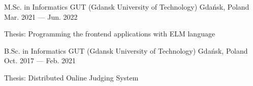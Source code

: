 
\begin{cventries}

  \cventry
    {M.Sc. in Informatics} %
    {GUT (Gdansk University of Technology)} %
    {Gdańsk, Poland} %
    {Mar. 2021 --- Jun. 2022} %
    {
      \begin{cvitems} %
        \item {Thesis: Programming the frontend applications with ELM language}
      \end{cvitems}
    }

  \cventry
    {B.Sc. in Informatics} %
    {GUT (Gdansk University of Technology)} %
    {Gdańsk, Poland} %
    {Oct. 2017 --- Feb. 2021} %
    {
      \begin{cvitems} %
        \item {Thesis: Distributed Online Judging System}
      \end{cvitems}
    }

\end{cventries}
